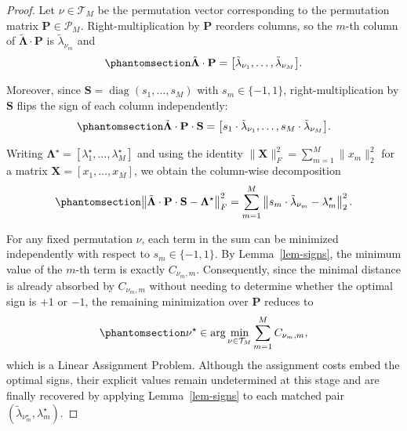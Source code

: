 \documentclass[
  man,
  longtable,
  nolmodern,
  notxfonts,
  notimes,
  colorlinks=true,linkcolor=blue,citecolor=blue,urlcolor=blue]{apa7}
\theoremstyle{plain}
\theoremstyle{plain}
\theoremstyle{remark}
\begin{document}
\begin{proof}
Let \(\nu \in \mathcal{T}_M\) be the permutation vector corresponding to
the permutation matrix \(\mathbf{P} \in \mathcal{P}_M\).
Right-multiplication by \(\mathbf{P}\) reorders columns, so the \(m\)-th
column of \(\tilde{\mathbf{\Lambda}}\cdot\mathbf{P}\) is
\(\tilde{\lambda}_{\nu_m}\) and
\begin{equation}\phantomsection\label{eq-12}{
\tilde{\mathbf{\Lambda}}\cdot\mathbf{P}=\big[\tilde{\lambda}_{\nu_1},\dots,\tilde{\lambda}_{\nu_M}\big].
}\end{equation}

Moreover, since \(\mathbf{S}=\operatorname{diag}(s_1,\dots,s_M)\) with
\(s_m\in\{-1,1\}\), right-multiplication by \(\mathbf{S}\) flips the
sign of each column independently:
\begin{equation}\phantomsection\label{eq-13}{
\tilde{\mathbf{\Lambda}}\cdot\mathbf{P}\cdot\mathbf{S}
=
\big[s_1\cdot\tilde{\lambda}_{\nu_1},\dots,s_M\cdot\tilde{\lambda}_{\nu_M}\big].
}\end{equation}

Writing
\(\mathbf{\Lambda}^\star=[\lambda^\star_1,\dots,\lambda^\star_M]\) and
using the identity \(\|\mathbf{X}\|_F^2=\sum_{m=1}^M\|x_m\|_2^2\) for a
matrix \(\mathbf{X}=[x_1,\dots,x_M]\), we obtain the column-wise
decomposition \begin{equation}\phantomsection\label{eq-14}{
\left\|\tilde{\mathbf\Lambda}\cdot\mathbf{P}\cdot\mathbf{S}-\mathbf{\Lambda}^\star\right\|_F^2
= \sum_{m=1}^M \left\| s_m\cdot\tilde{\lambda}_{\nu_m}-\lambda_m^\star \right\|_2^2.
}\end{equation}

For any fixed permutation \(\nu\), each term in the sum can be minimized
independently with respect to \(s_m \in \{-1, 1\}\). By
Lemma~\ref{lem-signs}, the minimum value of the \(m\)-th term is exactly
\(C_{\nu_m,m}\). Consequently, since the minimal distance is already
absorbed by \(C_{\nu_m,m}\) without needing to determine whether the
optimal sign is \(+1\) or \(-1\), the remaining minimization over
\(\mathbf{P}\) reduces to \begin{equation}\phantomsection\label{eq-15}{
\nu^\star \in \arg\min_{\nu \in \mathcal{T}_M} \sum_{m=1}^M C_{\nu_m,m},
}\end{equation} which is a Linear Assignment Problem. Although the
assignment costs embed the optimal signs, their explicit values remain
undetermined at this stage and are finally recovered by applying
Lemma~\ref{lem-signs} to each matched pair
\((\tilde{\lambda}_{\nu^\star_m}, \lambda^\star_m)\).
\end{proof}
\end{document}
